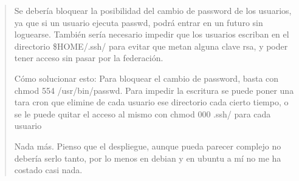 \begin{quote}
Se debería bloquear la posibilidad del cambio de password de los
usuarios, ya que si un usuario ejecuta passwd, podrá entrar en un futuro
sin loguearse.
También sería necesario impedir que los usuarios escriban en el
directorio \$HOME/.ssh/ para evitar que metan alguna clave rsa, y poder
tener acceso sin pasar por la federación.

Cómo solucionar esto:
Para bloquear el cambio de password, basta con chmod
554 /usr/bin/passwd.
Para impedir la escritura se puede poner una tara cron que elimine de
cada usuario ese directorio cada cierto tiempo, o se le puede quitar el
acceso al mismo con chmod 000 .ssh/ para cada usuario


Nada más. Pienso que el despliegue, aunque pueda parecer complejo no
debería serlo tanto, por lo menos en debian y en ubuntu a mí no me ha
costado casi nada.


    \end{quote}

\newpage



